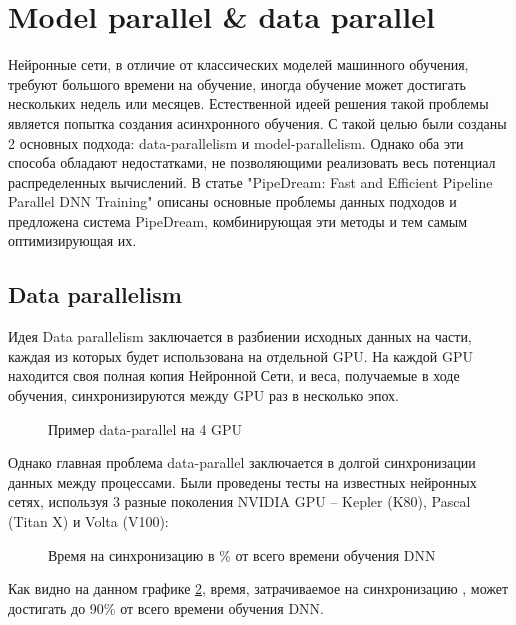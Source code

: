 
\newpage
\section{Model parallel \& data parallel}
Нейронные сети, в отличие от классических моделей машинного обучения, требуют большого времени на обучение, иногда обучение может достигать нескольких недель или месяцев. Естественной идеей решения такой проблемы является попытка создания асинхронного обучения. С такой целью были созданы 2 основных подхода: data-parallelism и model-parallelism. Однако оба эти способа обладают недостатками, не позволяющими реализовать весь потенциал распределенных вычислений. В статье "PipeDream: Fast and Efficient Pipeline Parallel DNN Training"\cite{pipedream} описаны основные проблемы данных подходов и предложена система PipeDream, комбинирующая эти методы и тем самым оптимизирующая их.

\subsection{Data parallelism}
Идея Data parallelism заключается в разбиении исходных данных на части, каждая из которых будет использована на отдельной GPU. На каждой GPU находится своя полная копия Нейронной Сети, и веса, получаемые в ходе обучения, синхронизируются между GPU раз в несколько эпох.


\begin{figure}[h]%
	\centering
	\caption{Пример data-parallel на 4 GPU}
	\label{data_parallel} %
\end{figure}


Однако главная проблема data-parallel заключается в долгой синхронизации данных между процессами. Были проведены тесты на известных нейронных сетях, используя 3 разные поколения NVIDIA GPU -- Kepler (K80), Pascal (Titan X) и Volta (V100):

\begin{figure}[h]%
	\centering
	\caption{Время на синхронизацию в \% от всего времени обучения DNN}
	\label{communication_overhead} %
\end{figure}

Как видно на данном графике \ref{communication_overhead}, время, затрачиваемое на синхронизацию , может достигать до 90\% от всего времени обучения DNN.


